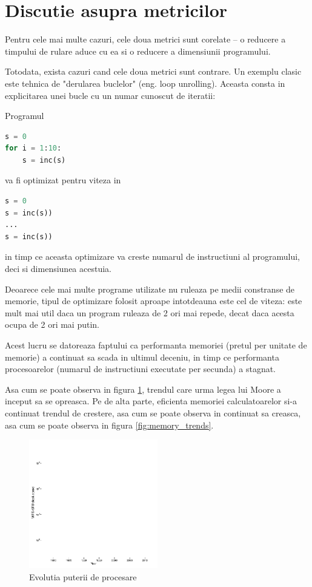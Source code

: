 \section{Discutie asupra metricilor}

Pentru cele mai multe cazuri, cele doua metrici sunt corelate --
o reducere a timpului de rulare aduce cu ea si o reducere a
dimensiunii programului.

Totodata, exista cazuri cand cele doua metrici sunt contrare.
Un exemplu clasic este tehnica de "derularea buclelor" (eng. loop
unrolling).
Aceasta consta in explicitarea unei bucle cu un numar cunoscut
de iteratii:

Programul
\begin{lstlisting}[language=Python]
s = 0
for i = 1:10:
    s = inc(s)
\end{lstlisting}

va fi optimizat pentru viteza in
\begin{lstlisting}[language=Python]
s = 0
s = inc(s))
...
s = inc(s))
\end{lstlisting}

in timp ce aceasta optimizare va creste numarul de instructiuni
al programului, deci si dimensiunea acestuia.

Deoarece cele mai multe programe utilizate nu ruleaza pe medii
constranse de memorie, tipul de optimizare folosit aproape
intotdeauna este cel de viteza: este mult mai util daca un
program ruleaza de 2 ori mai repede, decat daca acesta ocupa de
2 ori mai putin.

Acest lucru se datoreaza faptului ca performanta memoriei (pretul
per unitate de memorie) a continuat sa scada in ultimul deceniu,
in timp ce performanta procesoarelor (numarul de instructiuni
executate per secunda) a stagnat.

Asa cum se poate observa in figura \ref{fig:cpu_and_gpu_trends},
trendul care urma legea lui Moore \cite{moores_law} a inceput sa
se opreasca. Pe de alta parte, eficienta memoriei calculatoarelor
si-a continuat trendul de crestere, asa cum se poate observa in
continuat sa creasca, asa cum se poate observa in figura
\ref{fig:memory_trends}.

\begin{figure}
  \centering
  \includegraphics[width=0.5\textwidth]{cpu_and_gpu_trends}
  \caption{Evolutia puterii de procesare\cite{cpu_and_gpu_trends} }
  \label{fig:cpu_and_gpu_trends}
\end{figure}

